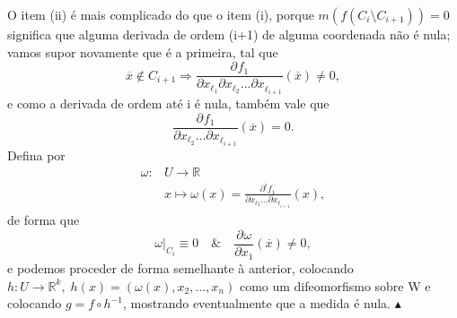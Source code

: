 \documentclass[../differential_topology.tex]{subfiles}
\begin{document}
\begin{proof*}
	O item (ii) é mais complicado do que o item (i), porque \(m(f(C_{i}\setminus{C_{i+1}}))=0\) significa que alguma derivada de ordem (i+1) de alguma coordenada não é nula; vamos supor novamente que é a primeira, tal que
	\[
		\overline{x}\not\in C_{i+1} \Rightarrow \frac{\partial^{}f_1}{\partial x_{\ell_{1}} \partial x_{\ell _{2}}\dotsc \partial x_{\ell_{i+1}}^{}}(\overline{x}) \neq 0,
	\]
	e como a derivada de ordem até i é nula, também vale que
	\[
		\frac{\partial^{}f_1}{\partial x_{\ell _{2}}\dotsc \partial x_{\ell_{i+1}}^{}}(\overline{x}) = 0.
	\]
	Defina por
	\begin{align*}
		\omega : & U\rightarrow\mathbb{R}                                                                                     \\
		         & x\longmapsto \omega (x) = \frac{\partial^{i}f_1}{\partial x_{\ell_2}\dotsc \partial x_{\ell_{i+1}}^{}}(x),
	\end{align*}
	de forma que
	\[
		\omega|_{C_{i}}\equiv 0 \quad\&\quad \frac{\partial^{}\omega }{\partial x_1^{}}(\overline{x})\neq 0,
	\]
	e podemos proceder de forma semelhante à anterior, colocando \(h:U\rightarrow \mathbb{R}^{k},\; h(x) = (\omega (x), x_2, \dotsc , x_{n})\) como um difeomorfismo sobre W e colocando \(g=f\circ h^{-1}\), mostrando eventualmente que a medida é nula.
	\(\blacktriangle\)


\end{proof*}
\end{document}
